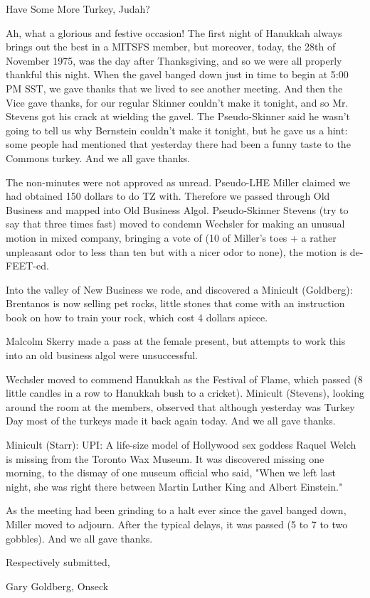 \documentclass[12pt]{article}
\begin{document}
\begin{center}

Have Some More Turkey, Judah?

\end{center}
 
\vspace{12pt}

\setlength{\parskip}{6pt}

\noindent
Ah, what a glorious and festive occasion! The first night of Hanukkah always brings out the best in a MITSFS member, but moreover, today, the 28th of November 1975, was the day after Thanksgiving, and so we were all properly thankful this night. When the gavel banged down just in time to begin at 5:00 PM SST, we gave thanks that we lived to see another meeting. And then the Vice gave thanks, for our regular Skinner couldn't make it tonight, and so Mr. Stevens got his crack at wielding the gavel. The Pseudo-Skinner said he wasn't going to tell us why Bernstein couldn't make it tonight, but he gave us a hint: some people had mentioned that yesterday there had been a funny taste to the Commons turkey. And we all gave thanks.

The non-minutes were not approved as unread. Pseudo-LHE Miller claimed we had obtained 150 dollars to do TZ with. Therefore we passed through Old Business and mapped into Old Business Algol. Pseudo-Skinner Stevens (try to say that three times fast) moved to condemn Wechsler for making an unusual motion in mixed company, bringing a vote of (10 of Miller's toes + a rather unpleasant odor to less than ten but with a nicer odor to none), the motion is de-FEET-ed.

Into the valley of New Business we rode, and discovered a Minicult (Goldberg): Brentanos is now selling pet rocks, little stones that come with an instruction book on how to train your rock, which cost 4 dollars apiece.

Malcolm Skerry made a pass at the female present, but attempts to work this into an old business algol were unsuccessful.

Wechsler moved to commend Hanukkah as the Festival of Flame, which passed (8 little candles in a row to Hanukkah bush to a cricket). Minicult (Stevens), looking around the room at the members, observed that although yesterday was Turkey Day most of the turkeys made it back again today. And we all gave thanks.

Minicult (Starr): UPI: A life-size model of Hollywood sex goddess Raquel Welch is missing from the Toronto Wax Museum. It was discovered missing one morning, to the dismay of one museum official who said, "When we left last night, she was right there between Martin Luther King and Albert Einstein."

As the meeting had been grinding to a halt ever since the gavel banged down, Miller moved to adjourn. After the typical delays, it was passed (5 to 7 to two gobbles). And we all gave thanks.

\vspace{12pt}

\centerline{Respectively submitted,}
\centerline{Gary Goldberg, Onseck}
\end{document}
